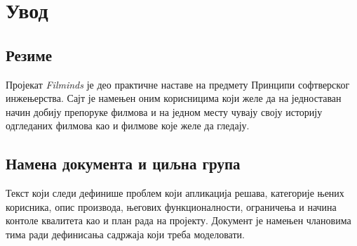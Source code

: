 \section{Увод}

\subsection{Резиме}

Пројекат \textit{Filminds} је део практичне наставе на предмету Принципи софтверског инжењерства.
Сајт је намењен оним корисницима који желе да на једноставан начин добију препоруке филмова и на
једном месту чувају своју историју одгледаних филмова као и филмове које желе да гледају.

\subsection{Намена документа и циљна група}

Текст који следи дефинише проблем који апликација решава, категорије њених корисника, опис
производа, његових функционалности, ограничења и начина контоле квалитета као и план рада на
пројекту. Документ је намењен члановима тима ради дефинисања садржаја који треба моделовати.
